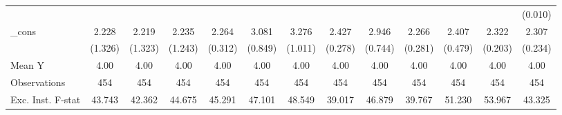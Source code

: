 {\begin{tabular}{l*{12}{c}}
            &                     &                     &                     &                     &                     &                     &                     &                     &                     &                     &                     &     (0.010)         \\
\addlinespace
\_cons      &       2.228         &       2.219         &       2.235\sym{*}  &       2.264\sym{***}&       3.081\sym{***}&       3.276\sym{***}&       2.427\sym{***}&       2.946\sym{***}&       2.266\sym{***}&       2.407\sym{***}&       2.322\sym{***}&       2.307\sym{***}\\
            &     (1.326)         &     (1.323)         &     (1.243)         &     (0.312)         &     (0.849)         &     (1.011)         &     (0.278)         &     (0.744)         &     (0.281)         &     (0.479)         &     (0.203)         &     (0.234)         \\
\midrule
Mean Y      &        4.00         &        4.00         &        4.00         &        4.00         &        4.00         &        4.00         &        4.00         &        4.00         &        4.00         &        4.00         &        4.00         &        4.00         \\
Observations&         454         &         454         &         454         &         454         &         454         &         454         &         454         &         454         &         454         &         454         &         454         &         454         \\
Exc. Inst. F-stat&      43.743         &      42.362         &      44.675         &      45.291         &      47.101         &      48.549         &      39.017         &      46.879         &      39.767         &      51.230         &      53.967         &      43.325         \\
\bottomrule
\end{tabular}
}
